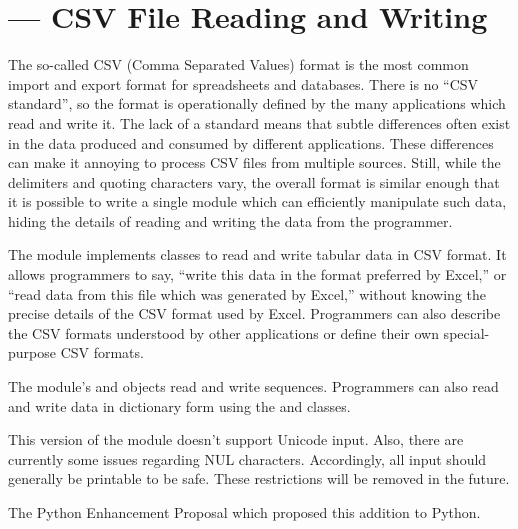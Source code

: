 \section{ --- CSV File Reading and Writing}



The so-called CSV (Comma Separated Values) format is the most common import
and export format for spreadsheets and databases.  There is no ``CSV
standard'', so the format is operationally defined by the many applications
which read and write it.  The lack of a standard means that subtle
differences often exist in the data produced and consumed by different
applications.  These differences can make it annoying to process CSV files
from multiple sources.  Still, while the delimiters and quoting characters
vary, the overall format is similar enough that it is possible to write a
single module which can efficiently manipulate such data, hiding the details
of reading and writing the data from the programmer.

The  module implements classes to read and write tabular data in
CSV format.  It allows programmers to say, ``write this data in the format
preferred by Excel,'' or ``read data from this file which was generated by
Excel,'' without knowing the precise details of the CSV format used by
Excel.  Programmers can also describe the CSV formats understood by other
applications or define their own special-purpose CSV formats.

The  module's  and  objects read and
write sequences.  Programmers can also read and write data in dictionary
form using the  and  classes.

\begin{notice}
  This version of the  module doesn't support Unicode
  input.  Also, there are currently some issues regarding \ASCII{} NUL
  characters.  Accordingly, all input should generally be printable
  \ASCII{} to be safe.  These restrictions will be removed in the future.
\end{notice}

\begin{seealso}
         {The Python Enhancement Proposal which proposed this addition
          to Python.}
\end{seealso}


